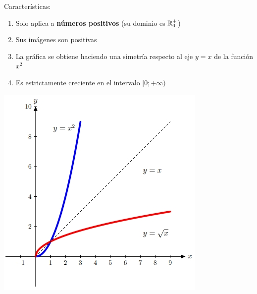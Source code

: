 Características:
\begin{enumerate}
    \item Solo aplica a \textbf{números positivos} (su dominio es ${\mathbb{R}}_0^+$)
    \item Sus imágenes son positivas
    \item La gráfica se obtiene haciendo una simetría respecto al eje $y = x$ de la función $x^2$
    \item Es estrictamente creciente en el intervalo $[0; +\infty)$
\end{enumerate}

\begin{center}
    \includegraphics[width=0.7\linewidth]{img/sqrt(x).jpg}
\end{center}
